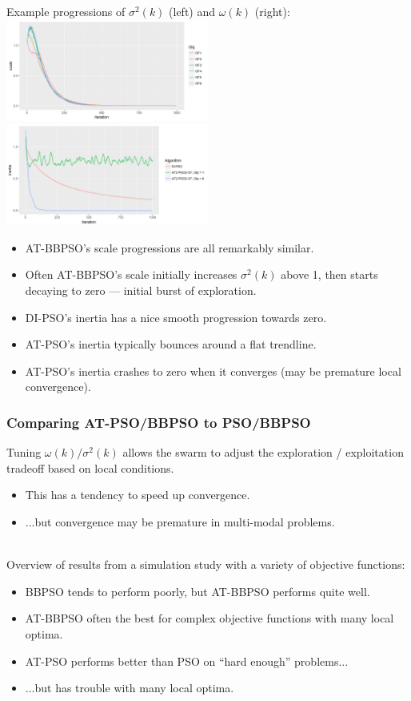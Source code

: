 \documentclass[xcolor=dvipsnames]{beamer}
\begin{document}
\begin{frame}
Example progressions of $\sigma^2(k)$ (left) and $\omega(k)$ (right):
\includegraphics[width = 0.5\textwidth]{../doc/scaleplot.png}
\includegraphics[width = 0.5\textwidth]{../doc/inertiaplot.png}
\pause
\begin{itemize}
\item  AT-BBPSO's scale progressions are all remarkably similar.\pause
\item  Often AT-BBPSO's scale initially increases $\sigma^2(k)$ above 1, then starts decaying to zero --- initial burst of exploration.\pause
\item  DI-PSO's inertia has a nice smooth progression towards zero. \pause
\item  AT-PSO's inertia typically bounces around a flat trendline.\pause
\item  AT-PSO's inertia crashes to zero when it converges (may be premature local convergence).
\end{itemize}
\end{frame}

\begin{frame}
\frametitle{Comparing AT-PSO/BBPSO to PSO/BBPSO}
Tuning $\omega(k)/\sigma^2(k)$ allows the swarm to adjust the exploration / exploitation tradeoff based on local conditions.
\begin{itemize}
\item This has a tendency to speed up convergence.
\item ...but convergence may be premature in multi-modal problems.\\~\\
\end{itemize}

\pause

Overview of results from a simulation study with a variety of objective functions:
\begin{itemize}
\item BBPSO tends to perform poorly, but AT-BBPSO performs quite well. \pause
\item AT-BBPSO often the best for complex objective functions with many local optima. \pause 
\item AT-PSO performs better than PSO on ``hard enough'' problems... \pause
\item ...but has trouble with many local optima.
\end{itemize}
\end{frame}
\end{document}
